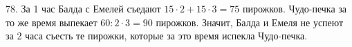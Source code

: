 78. За 1 час Балда с Емелей съедают $15\cdot2+15\cdot3=75$ пирожков. Чудо-печка за то же время выпекает $60:2\cdot3=90$ пирожков. Значит, Балда и Емеля не успеют за 2 часа съесть те пирожки, которые за это время испекла Чудо-печка.\\
